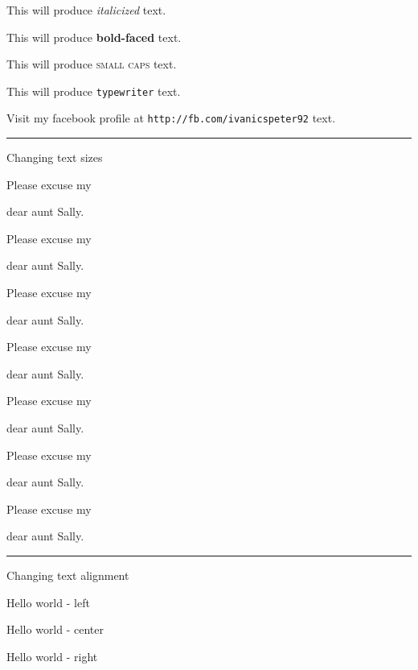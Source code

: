 \documentclass[11]{article}
\begin{document}
	This will produce \textit{italicized} text. 
	
	This will produce \textbf{bold-faced} text. 
	
	This will produce \textsc{small caps} text.
	 
	This will produce \texttt{typewriter} text. 
	
	Visit my facebook profile at \texttt{http://fb.com/ivanicspeter92} text.
	\hrule
	Changing text sizes
	
	Please excuse my \begin{large}dear aunt Sally.\end{large}
	
	Please excuse my \begin{Large}dear aunt Sally.\end{Large}
	
	Please excuse my \begin{LARGE}dear aunt Sally.\end{LARGE}
	
	Please excuse my \begin{huge}dear aunt Sally.\end{huge}
	
	Please excuse my \begin{Huge}dear aunt Sally.\end{Huge}
	
	Please excuse my \begin{small}dear aunt Sally.\end{small}
	
	Please excuse my \begin{tiny}dear aunt Sally.\end{tiny} 
	\hrule
	Changing text alignment
	\begin{flushleft}Hello world - left\end{flushleft}
	\begin{center}Hello world - center\end{center}
	\begin{flushright}Hello world - right\end{flushright}
\end{document}
